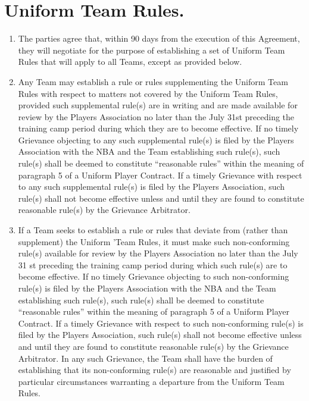 \documentclass[
]{book}
\providecommand{\tightlist}{%
  \setlength{\itemsep}{0pt}\setlength{\parskip}{0pt}}
\begin{document}
\hypertarget{uniform-team-rules.}{%
\section{Uniform Team Rules.}\label{uniform-team-rules.}}

\begin{enumerate}
\def\labelenumi{(\alph{enumi})}
\tightlist
\item
  The parties agree that, within 90 days from the execution of this Agreement, they will negotiate for the purpose of establishing a set of Uniform Team Rules that will apply to all Teams, except as provided below.
\item
  Any Team may establish a rule or rules supplementing the Uniform Team Rules with respect to matters not covered by the Uniform Team Rules, provided such supplemental rule(s) are in writing and are made available for review by the Players Association no later than the July 31st preceding the training camp period during which they are to become effective. If no timely Grievance objecting to any such supplemental rule(s) is filed by the Players Association with the NBA and the Team establishing such rule(s), such rule(s) shall be deemed to constitute ``reasonable rules'' within the meaning of paragraph 5 of a Uniform Player Contract. If a timely Grievance with respect to any such supplemental rule(s) is filed by the Players Association, such rule(s) shall not become effective unless and until they are found to constitute reasonable rule(s) by the Grievance Arbitrator.
\item
  If a Team seeks to establish a rule or rules that deviate from (rather than supplement) the Uniform 'Team Rules, it must make such non-conforming rule(s) available for review by the Players Association no later than the July 31 st preceding the training camp period during which such rule(s) are to become effective. If no timely Grievance objecting to such non-conforming rule(s) is filed by the Players Association with the NBA and the Team establishing such rule(s), such rule(s) shall be deemed to constitute ``reasonable rules'' within the meaning of paragraph 5 of a Uniform Player Contract. If a timely Grievance with respect to such non-conforming rule(s) is filed by the Players Association, such rule(s) shall not become effective unless and until they are found to constitute reasonable rule(s) by the Grievance Arbitrator. In any such Grievance, the Team shall have the burden of establishing that its non-conforming rule(s) are reasonable and justified by particular circumstances warranting a departure from the Uniform Team Rules.
\end{enumerate}
\end{document}
